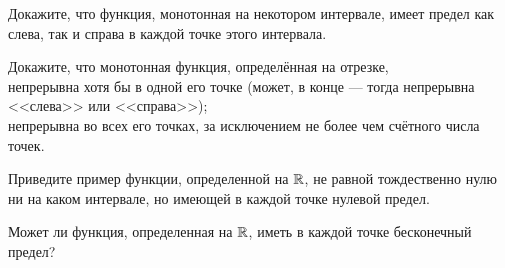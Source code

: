 \documentclass[a4paper, 12pt]{article}
\newcommand{\0}[1]{\overline{#1}}
\begin{document}
 Докажите, что функция, монотонная на некотором интервале,
имеет предел как слева, так и справа в каждой точке этого интервала.

Докажите, что монотонная функция, определённая на отрезке, \\
 непрерывна хотя  бы в одной его точке (может, в конце --- тогда непрерывна <<слева>> или <<справа>>);\\
 непрерывна во всех его точках, за исключением не более чем счётного числа точек.


 Приведите пример функции, определенной на $\mathbb{R}$, не равной тождественно
нулю ни на каком интервале, но имеющей в каждой точке нулевой предел.

Может ли функция, определенная на $\mathbb{R}$, иметь в каждой
точке бесконечный предел?




\end{document}
